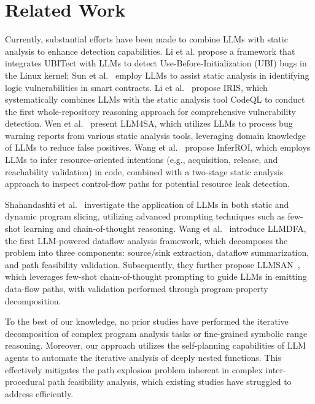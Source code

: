 \section{Related Work}


Currently, substantial efforts have been made to combine LLMs with static analysis to enhance detection capabilities. Li et al.\cite{li2023hitchhikers} propose a framework that integrates UBITect with LLMs to detect Use-Before-Initialization (UBI) bugs in the Linux kernel; Sun et al.~\cite{sun2023gpt} employ LLMs to assist static analysis in identifying logic vulnerabilities in smart contracts. Li et al.~\cite{li2024llm} propose IRIS, which systematically combines LLMs with the static analysis tool CodeQL to conduct the first whole-repository reasoning approach for comprehensive vulnerability detection. Wen et al.~\cite{llm4sa} present LLM4SA, which utilizes LLMs to process bug warning reports from various static analysis tools, leveraging domain knowledge of LLMs to reduce false positives.
Wang et al.~\cite{wang2023boosting} propose InferROI, which employs LLMs to infer resource-oriented intentions (e.g., acquisition, release, and reachability validation) in code, combined with a two-stage static analysis approach to inspect control-flow paths for potential resource leak detection.

Shahandashti et al.~\cite{shahandashti2024program} investigate the application of LLMs in both static and dynamic program slicing, utilizing advanced prompting techniques such as few-shot learning and chain-of-thought reasoning.
Wang et al.~\cite{llmdfa} introduce LLMDFA, the first LLM-powered dataflow analysis framework, which decomposes the problem into three components: source/sink extraction, dataflow summarization, and path feasibility validation.
Subsequently, they further propose LLMSAN~\cite{wang2024sanitizing}, which leverages few-shot chain-of-thought prompting to guide LLMs in emitting data-flow paths, with validation performed through program-property decomposition.

To the best of our knowledge, no prior studies have performed the iterative decomposition of complex program analysis tasks or fine-grained symbolic range reasoning. Moreover, our approach utilizes the self-planning capabilities of LLM agents to automate the iterative analysis of deeply nested functions. This effectively mitigates the path explosion problem inherent in complex inter-procedural path feasibility analysis, which existing studies have struggled to address efficiently.
